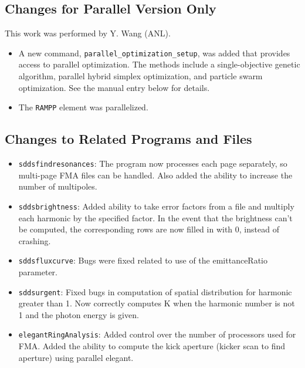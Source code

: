 \documentclass[11pt]{article}
\begin{document}
\subsection{Changes for Parallel Version Only}

This work was performed by Y. Wang (ANL).
\begin{itemize}
\item A new command, \verb|parallel_optimization_setup|, was added that provides access to parallel optimization. The methods include
  a single-objective genetic algorithm, parallel hybrid simplex optimization, and particle swarm optimization.  See the
  manual entry below for details.  
\item The {\tt RAMPP} element was parallelized.
\end{itemize}

\subsection{Changes to Related Programs and Files}

\begin{itemize}
\item {\tt sddsfindresonances}: The program now processes each page separately, so multi-page FMA files can be handled.
  Also added the ability to increase the number of multipoles.
\item {\tt sddsbrightness}: Added ability to take error factors from a file and multiply each harmonic by the specified factor.
  In the event that the brightness can't be computed, the corresponding rows are now filled in with 0, instead of crashing.
\item {\tt sddsfluxcurve}: Bugs were fixed related to use of the emittanceRatio parameter.
\item {\tt sddsurgent}: Fixed bugs in computation of spatial distribution for harmonic greater than 1.  Now correctly 
  computes K when the harmonic number is not 1 and the photon energy is given.
\item {\tt elegantRingAnalysis}: Added control over the number of processors used for FMA.  Added the ability to compute
  the kick aperture (kicker scan to find aperture) using parallel elegant.
\end{itemize}
\end{document}
